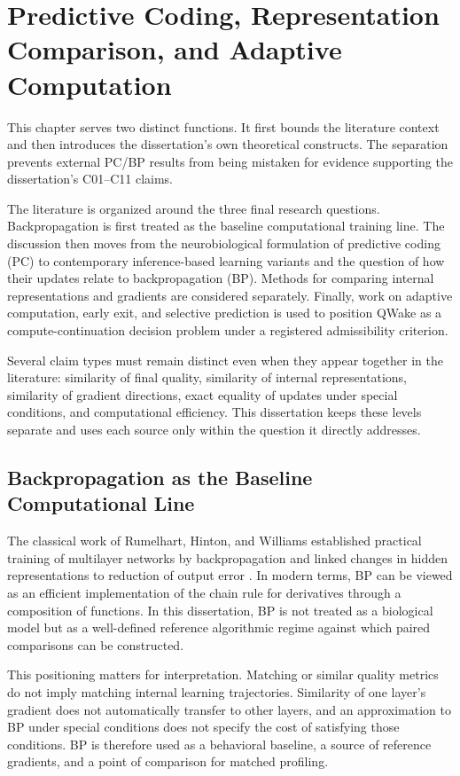\chapter{Predictive Coding, Representation Comparison, and Adaptive Computation}
\label{ch:related-work}

This chapter serves two distinct functions. It first bounds the literature context and
then introduces the dissertation's own theoretical constructs. The separation prevents
external PC/BP results from being mistaken for evidence supporting the dissertation's
C01--C11 claims.

The literature is organized around the three final research questions. Backpropagation
is first treated as the baseline computational training line. The discussion then
moves from the neurobiological formulation of predictive coding (PC) to contemporary
inference-based learning variants and the question of how their updates relate to
backpropagation (BP). Methods for comparing internal representations and gradients are
considered separately. Finally, work on adaptive computation, early exit, and selective
prediction is used to position QWake as a compute-continuation decision problem under
a registered admissibility criterion.

Several claim types must remain distinct even when they appear together in the
literature: similarity of final quality, similarity of internal representations,
similarity of gradient directions, exact equality of updates under special conditions,
and computational efficiency. This dissertation keeps these levels separate and uses
each source only within the question it directly addresses.

\section{Backpropagation as the Baseline Computational Line}
\label{sec:related-bp}

The classical work of Rumelhart, Hinton, and Williams established practical training
of multilayer networks by backpropagation and linked changes in hidden representations
to reduction of output error \cite{rumelhart1986backprop}. In modern terms, BP can be
viewed as an efficient implementation of the chain rule for derivatives through a
composition of functions. In this dissertation, BP is not treated as a biological
model but as a well-defined reference algorithmic regime against which paired
comparisons can be constructed.

This positioning matters for interpretation. Matching or similar quality metrics do
not imply matching internal learning trajectories. Similarity of one layer's gradient
does not automatically transfer to other layers, and an approximation to BP under
special conditions does not specify the cost of satisfying those conditions. BP is
therefore used as a behavioral baseline, a source of reference gradients, and a point
of comparison for matched profiling.

